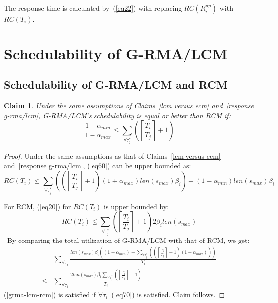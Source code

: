 \documentclass[12pt,english]{report}
\newtheorem{clm}{Claim}
\newtheorem{proof}{Proof}
\begin{document}
The response time is calculated by~(\ref{eq22}) with replacing $RC(R_i^{up})$ with $RC(T_i)$.

\section{Schedulability of G-RMA/LCM}
\label{rma eval}

\subsection{Schedulability of G-RMA/LCM and RCM}

\begin{clm}\label{rma_eval_clm}
Under the same assumptions of Claims~\ref{lcm versus ecm} and~\ref{response g-rma/lcm}, G-RMA/LCM's schedulability is equal or better than RCM if:
\begin{equation}
\frac{1-\alpha_{min}}{1-\alpha_{max}}\le \sum_{\forall \tau_j^*}\left( \left\lceil\frac{T_i}{T_j}\right\rceil +1 \right)
\label{eq70}\end{equation}
\end{clm}

\begin{proof}\normalfont
Under the same assumptions as that of Claims~\ref{lcm versus ecm} and~\ref{response g-rma/lcm}, (\ref{eq60}) can be upper bounded as:
\begin{equation}
RC(T_i) \le \sum_{\forall \tau_{j}^{*}}\left(\left(\left\lceil\frac{T_{i}}{T_{j}}\right\rceil +1\right)(1+\alpha_{max}) len(s_{max})\beta_{i}\right) + (1-\alpha_{min})len(s_{max})\beta_{i}\label{eq68}\end{equation} 
 
For RCM, (\ref{eq20}) for $RC(T_{i})$ is upper bounded by:
\begin{equation*}
RC(T_{i})\le\sum_{\forall \tau_{j}^{*}}\left(\left\lceil\frac{T_{i}}{T_{j}}\right\rceil +1\right)2\beta_{i}len(s_{max})\label{eq69}\end{equation*}\
By comparing the total utilization of G-RMA/LCM with that of RCM,
we get:
\begin{eqnarray}
 & \sum_{\forall\tau_{i}}\frac{len\left(s_{max}\right)\beta_{i}\left(\left(1-\alpha_{min}\right)+\sum_{\forall\tau_{j}^{*}}\left(\left(\left\lceil\frac{T_{i}}{T_{j}}\right\rceil+1\right)\left(1+\alpha_{max}\right)\right)\right)}{T_{i}}\nonumber\\
\le & \sum_{\forall\tau_{i}}\frac{2len\left(s_{max}\right)\beta_{i}\sum_{\forall\tau_{j}^{*}}\left(\left\lceil\frac{T_{i}}{T_{j}}\right\rceil+1\right)}{T_{i}}\label{grma-lcm-rcm}\end{eqnarray}
(\ref{grma-lcm-rcm}) is satisfied if $\forall \tau_i$~(\ref{eq70}) is satisfied. Claim follows.
\end{proof}
\end{document}
